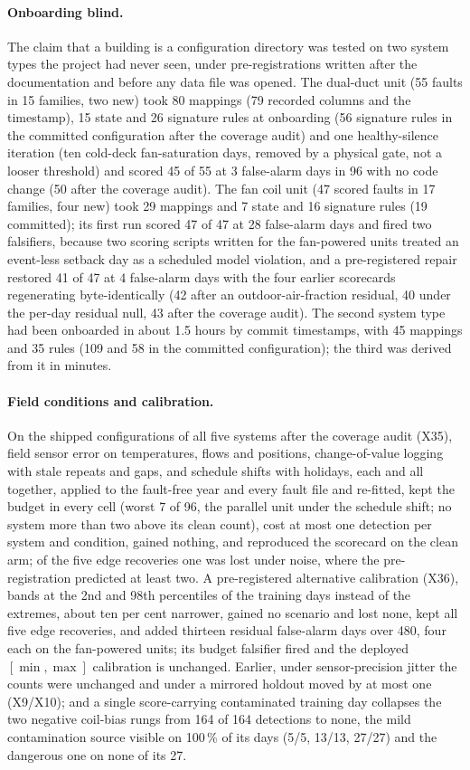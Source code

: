 \documentclass[11pt,letterpaper]{article}
\begin{document}
\paragraph{Onboarding blind.} The claim that a building is a configuration directory was tested on two system types the project had never seen, under pre-registrations written after the documentation and before any data file was opened. The dual-duct unit (55 faults in 15 families, two new) took 80 mappings (79 recorded columns and the timestamp), 15 state and 26 signature rules at onboarding (56 signature rules in the committed configuration after the coverage audit) and one healthy-silence iteration (ten cold-deck fan-saturation days, removed by a physical gate, not a looser threshold) and scored 45 of 55 at 3 false-alarm days in 96 with no code change (50 after the coverage audit). The fan coil unit (47 scored faults in 17 families, four new) took 29 mappings and 7 state and 16 signature rules (19 committed); its first run scored 47 of 47 at 28 false-alarm days and fired two falsifiers, because two scoring scripts written for the fan-powered units treated an event-less setback day as a scheduled model violation, and a pre-registered repair restored 41 of 47 at 4 false-alarm days with the four earlier scorecards regenerating byte-identically (42 after an outdoor-air-fraction residual, 40 under the per-day residual null, 43 after the coverage audit). The second system type had been onboarded in about 1.5 hours by commit timestamps, with 45 mappings and 35 rules (109 and 58 in the committed configuration); the third was derived from it in minutes.

\paragraph{Field conditions and calibration.} On the shipped configurations of all five systems after the coverage audit (X35), field sensor error on temperatures, flows and positions, change-of-value logging with stale repeats and gaps, and schedule shifts with holidays, each and all together, applied to the fault-free year and every fault file and re-fitted, kept the budget in every cell (worst 7 of 96, the parallel unit under the schedule shift; no system more than two above its clean count), cost at most one detection per system and condition, gained nothing, and reproduced the scorecard on the clean arm; of the five edge recoveries one was lost under noise, where the pre-registration predicted at least two. A pre-registered alternative calibration (X36), bands at the 2nd and 98th percentiles of the training days instead of the extremes, about ten per cent narrower, gained no scenario and lost none, kept all five edge recoveries, and added thirteen residual false-alarm days over 480, four each on the fan-powered units; its budget falsifier fired and the deployed $[\min,\max]$ calibration is unchanged. Earlier, under sensor-precision jitter the counts were unchanged and under a mirrored holdout moved by at most one (X9/X10); and a single score-carrying contaminated training day collapses the two negative coil-bias rungs from 164 of 164 detections to none, the mild contamination source visible on 100\,\% of its days (5/5, 13/13, 27/27) and the dangerous one on none of its 27.
\end{document}

